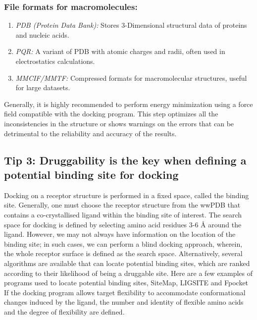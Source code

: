 \documentclass[10pt,letterpaper]{article}
\begin{document}
{{\subsubsection*{File formats for macromolecules:}
    \begin{enumerate}
        \item \textit{PDB (Protein Data Bank):} Stores 3-Dimensional structural data of proteins and nucleic acids. 
	       \item \textit{PQR:} A variant of PDB with atomic charges and radii, often used in electrostatics calculations.
	       \item \textit{MMCIF/MMTF:} Compressed formats for macromolecular structures, useful for large datasets. 
    \end{enumerate}


Generally, it is highly recommended to perform energy minimization using a force field compatible with the docking program. This step optimizes all the inconsistencies in the structure or shows warnings on the errors that can be detrimental to the reliability and accuracy of the results. 

\subsection*{Tip 3: Druggability is the key when defining a potential binding site for docking}

Docking on a receptor structure is performed in a fixed space, called the binding site. Generally, one must choose the receptor structure from the wwPDB that contains a co-crystallised ligand within the binding site of interest. The search space for docking is defined by selecting amino acid residues 3-6 \r{A} around the ligand.  However, we may not always have information on the location of the binding site; in such cases, we can perform a blind docking approach, wherein, the whole receptor surface is defined as the search space. Alternatively, several algorithms are available that can locate potential binding sites, which are ranked according to their likelihood of being a druggable site. Here are a few examples of programs used to locate potential binding sites, SiteMap\cite{bib7}, LIGSITE \cite{bib8} and Fpocket\cite{bib9} If the docking program allows target flexibility to accommodate conformational changes induced by the ligand, the number and identity of flexible amino acids and the degree of flexibility are defined. 
    
}}
\end{document}
